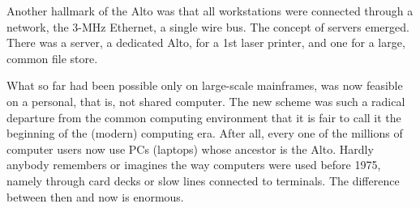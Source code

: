 Another hallmark of the Alto was that all workstations were connected through a
network, the 3-MHz Ethernet, a single wire bus. The concept of servers emerged. There
was a server, a dedicated Alto, for a 1st laser printer, and one for a large, common
file store.

What so far had been possible only on large-scale mainframes, was now feasible on a
personal, that is, not shared computer. The new scheme was such a radical departure
from the common computing environment that it is fair to call it the beginning of the
(modern) computing era. After all, every one of the millions of computer users now
use PCs (laptops) whose ancestor is the Alto. Hardly anybody remembers or imagines
the way computers were used before 1975, namely through card decks or slow lines
connected to terminals. The difference between then and now is enormous.
